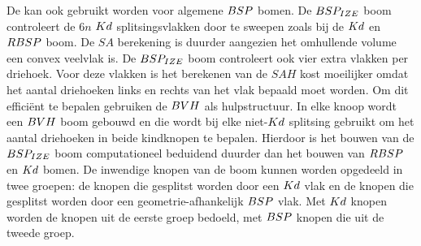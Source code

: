     De \symSAH{} kan ook gebruikt worden voor algemene $BSP$ bomen. De $BSP_{IZE}$ boom controleert de $6n$ $Kd$ splitsingsvlakken door te sweepen zoals bij de $Kd$ en $RBSP$ boom. De $SA$ berekening is duurder aangezien het omhullende volume een convex veelvlak is. 
    De $BSP_{IZE}$ boom controleert ook vier extra vlakken per driehoek. 
    Voor deze vlakken is het berekenen van de $SAH$ kost moeilijker omdat het aantal driehoeken links en rechts van het vlak bepaald moet worden. 
    Om dit efficiënt te bepalen gebruiken \authorIze{} \cite{ize} de $BVH$ als hulpstructuur. 
    In elke knoop wordt een $BVH$ boom gebouwd en die wordt bij elke niet-$Kd$ splitsing gebruikt om het aantal driehoeken in beide kindknopen te bepalen.
    Hierdoor is het bouwen van de $BSP_{IZE}$ boom computationeel beduidend duurder dan het bouwen van $RBSP$ en $Kd$ bomen. 
    De inwendige knopen van de boom kunnen worden opgedeeld in twee groepen: de knopen die gesplitst worden door een $Kd$ vlak en de knopen die gesplitst worden door een geometrie-afhankelijk $BSP$ vlak.
    Met $Kd$ knopen worden de knopen uit de eerste groep bedoeld, met $BSP$ knopen die uit de tweede groep.\\

